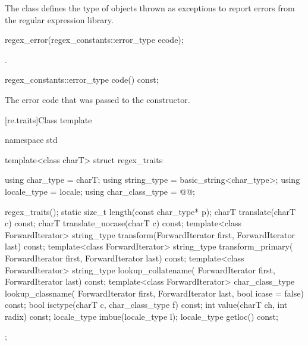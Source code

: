 \pnum
The class  defines the type of objects thrown as
exceptions to report errors from the regular expression library.

\begin{indexed}{}
\begin{itemdecl}
regex_error(regex_constants::error_type ecode);
\end{itemdecl}
\end{indexed}

\begin{itemdescr}
\pnum
\ensures
{}.
\end{itemdescr}

%
%
\begin{itemdecl}
regex_constants::error_type code() const;
\end{itemdecl}

\begin{itemdescr}
\pnum
\returns
The error code that was passed to the constructor.
\end{itemdescr}

[re.traits]{Class template }
%
\begin{codeblock}
namespace std {
  template<class charT>
    struct regex_traits {
      using char_type       = charT;
      using string_type     = basic_string<char_type>;
      using locale_type     = locale;
      using char_class_type = @@;

      regex_traits();
      static size_t length(const char_type* p);
      charT translate(charT c) const;
      charT translate_nocase(charT c) const;
      template<class ForwardIterator>
        string_type transform(ForwardIterator first, ForwardIterator last) const;
      template<class ForwardIterator>
        string_type transform_primary(
          ForwardIterator first, ForwardIterator last) const;
      template<class ForwardIterator>
        string_type lookup_collatename(
          ForwardIterator first, ForwardIterator last) const;
      template<class ForwardIterator>
        char_class_type lookup_classname(
          ForwardIterator first, ForwardIterator last, bool icase = false) const;
      bool isctype(charT c, char_class_type f) const;
      int value(charT ch, int radix) const;
      locale_type imbue(locale_type l);
      locale_type getloc() const;
    };
}
\end{codeblock}

